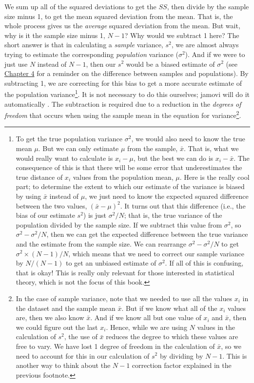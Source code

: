 \documentclass[
  openany]{krantz}
\begin{document}
We sum up all of the squared deviations to get the \(SS\), then divide by the sample size minus 1, to get the mean squared deviation from the mean.
That is, the whole process gives us the \emph{average} squared deviation from the mean.
But wait, why is it the sample size minus 1, \(N - 1\)?
Why would we subtract 1 here?
The short answer is that in calculating a \emph{sample} variance, \(s^{2}\), we are almost always trying to estimate the corresponding \emph{population} variance (\(\sigma^{2}\)).
And if we were to just use \(N\) instead of \(N - 1\), then our \(s^{2}\) would be a biased estimate of \(\sigma^{2}\) (see \protect\hyperlink{Chapter_4}{Chapter 4} for a reminder on the difference between samples and populations).
By subtracting 1, we are correcting for this bias to get a more accurate estimate of the population variance\footnote{To get the true population variance \(\sigma^{2}\), we would also need to know the true mean \(\mu\). But we can only estimate \(\mu\) from the sample, \(\bar{x}\). That is, what we would really want to calculate is \(x_{i} - \mu\), but the best we can do is \(x_{i} - \bar{x}\). The consequence of this is that there will be some error that underestimates the true distance of \(x_{i}\) values from the population mean, \(\mu\). Here is the really cool part; to determine the extent to which our estimate of the variance is biased by using \(\bar{x}\) instead of \(\mu\), we just need to know the expected squared difference between the two values, \((\bar{x} - \mu)^{2}\). It turns out that this difference (i.e., the bias of our estimate \(s^{2}\)) is just \(\sigma^{2} / N\); that is, the true variance of the population divided by the sample size. If we subtract this value from \(\sigma^{2}\), so \(\sigma^{2} - \sigma^{2}/N\), then we can get the expected difference between the true variance and the estimate from the sample size. We can rearrange \(\sigma^{2} - \sigma^{2}/N\) to get \(\sigma^{2} \times (N - 1)/N\), which means that we need to correct our sample variance by \(N / (N-1)\) to get an unbiased estimate of \(\sigma^{2}\). If all of this is confusing, that is okay! This is really only relevant for those interested in statistical theory, which is not the focus of this book.}.
It is not necessary to do this ourselves; jamovi will do it automatically \citep{Jamovi2022}.
The subtraction is required due to a reduction in the \emph{degrees of freedom} that occurs when using the sample mean in the equation for variance\footnote{In the case of sample variance, note that we needed to use all the values \(x_{i}\) in the dataset and the sample mean \(\bar{x}\). But if we know what all of the \(x_{i}\) values are, then we also know \(\bar{x}\). And if we know all but one value of \(x_{i}\) and \(\bar{x}\), then we could figure out the last \(x_{i}\). Hence, while we are using \(N\) values in the calculation of \(s^{2}\), the use of \(\bar{x}\) reduces the degree to which these values are free to vary. We have lost 1 degree of freedom in the calculation of \(\bar{x}\), so we need to account for this in our calculation of \(s^{2}\) by dividing by \(N - 1\). This is another way to think about the \(N - 1\) correction factor \citep{Sokal1995} explained in the previous footnote.}.
\end{document}
